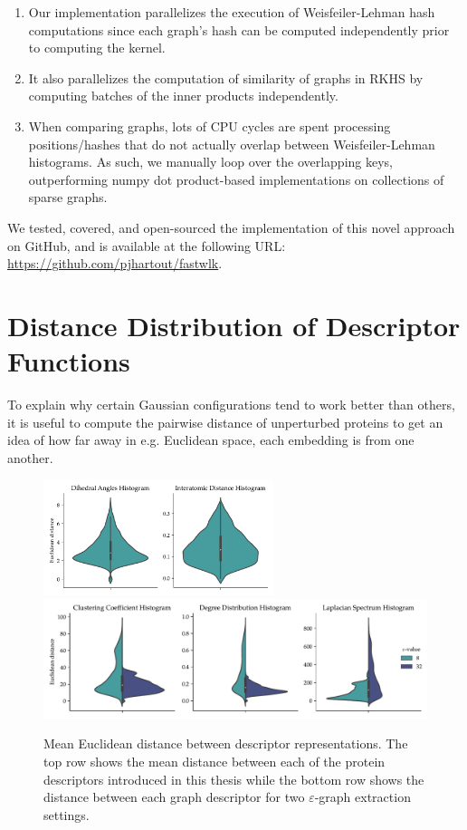 \begin{enumerate}
\item Our implementation parallelizes the execution of Weisfeiler-Lehman hash
computations since each graph's hash can be computed independently prior to
computing the kernel.
\item It also parallelizes the computation of similarity of graphs in RKHS by
computing batches of the inner products independently.
\item When comparing graphs, lots of CPU cycles are spent processing
positions/hashes that do not actually overlap between Weisfeiler-Lehman
histograms. As such, we manually loop over the overlapping keys, outperforming
numpy dot product-based implementations on collections of sparse graphs.
\end{enumerate}

We tested, covered, and open-sourced the implementation of this novel approach
on GitHub, and is available at the following URL: \url{https://github.com/pjhartout/fastwlk}.

\section{Distance Distribution of Descriptor Functions}\label{sec:distance_dist}
To explain why certain Gaussian configurations tend to work better than others,
it is useful to compute the pairwise distance of unperturbed proteins to get an
idea of how far away in e.g. Euclidean space, each embedding is from one
another.

\begin{figure}
  \centering
  \includegraphics[width=0.6\textwidth]{./figures/results/violin_protein_descriptors.pdf}
  \includegraphics[width=\textwidth]{./figures/results/violin_graph_descriptors.pdf}
  \caption{Mean Euclidean distance between descriptor representations. The top
    row shows the mean distance between each of the protein descriptors
    introduced in this thesis while the bottom row shows the distance between
    each graph descriptor for two $\varepsilon$-graph extraction settings.}
\end{figure}
